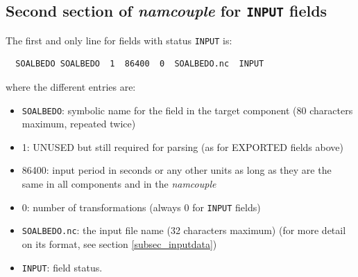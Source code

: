 \subsection{Second section of {\it namcouple} for {\tt INPUT} fields}
\label{subsubsec_secondINPUT}

The first and only line for fields with status {\tt INPUT} is:

  \begin{verbatim}
  SOALBEDO SOALBEDO  1  86400  0  SOALBEDO.nc  INPUT
  \end{verbatim}
\vspace{-0.5cm}
where the different entries are:
\begin{itemize}
\item {\tt SOALBEDO}: symbolic name for the field in the target component
  (80 characters maximum, repeated twice)
\item 1: UNUSED but still required for parsing (as for
  EXPORTED fields above)
\item 86400: input period in seconds or any other units as long as they are the same in all components and in the {\it namcouple}
\item 0: number of transformations (always 0 for {\tt INPUT} fields)
\item {\tt SOALBEDO.nc}:  the input file name (32 characters maximum)
  (for more detail on its format, see section \ref{subsec_inputdata})
\item {\tt INPUT}: field status.
\end{itemize}
